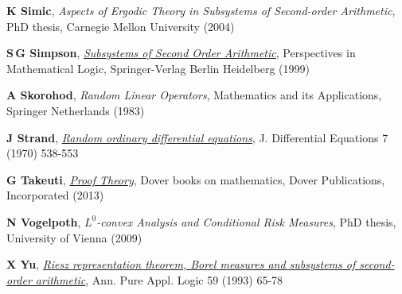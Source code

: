 \documentclass{jloganal}
\numberwithin{equation}{section}
\theoremstyle{plain}
\begin{document}
\begin{thebibliography}{}
\textbf{K Simic}, \emph{{Aspects of Ergodic Theory in Subsystems of
  Second-order Arithmetic}}, PhD thesis, Carnegie Mellon University (2004)

\textbf{S\,G Simpson}, \href{http://dx.doi.org/10.1017/CBO9780511581007}
  {\emph{{Subsystems of Second Order Arithmetic}}}, Perspectives in
  Mathematical Logic, Springer-Verlag Berlin Heidelberg (1999)

\textbf{A Skorohod}, \emph{Random Linear Operators}, Mathematics and its
  Applications, Springer Netherlands (1983)

\textbf{J Strand}, \href{http://dx.doi.org/DOI:10.1016/0022-0396(70)90100-2}
  {\emph{Random ordinary differential equations}}, J. Differential Equations 7
  (1970) 538-553

\textbf{G Takeuti}, \href{https://books.google.de/books?id=Idl6K-W69NYC}
  {\emph{Proof Theory}}, Dover books on mathematics, Dover Publications,
  Incorporated (2013)

\textbf{N Vogelpoth}, \emph{{$L^0$-convex Analysis and Conditional Risk
  Measures}}, PhD thesis, University of Vienna (2009)

\textbf{X Yu}, \href{http://dx.doi.org/10.1016/0168-0072(93)90232-3}
  {\emph{{Riesz representation theorem, Borel measures and subsystems of
  second-order arithmetic}}}, Ann. Pure Appl. Logic 59 (1993) 65-78

\end{thebibliography}
\end{document}
